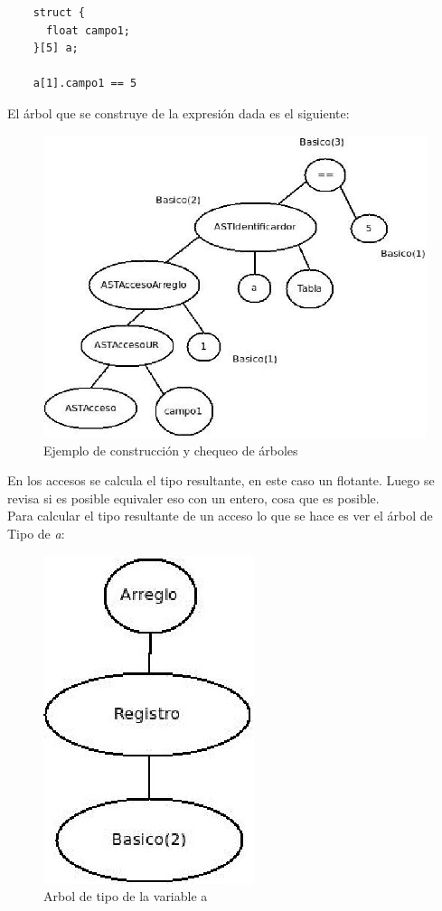 \documentclass[11pt, spanish]{report}
\begin{document}
     \begin{verbatim}
	struct {
	  float campo1;
	}[5] a;

	a[1].campo1 == 5
     \end{verbatim}

\newpage 
El \'arbol que se construye de la expresi\'on dada es el siguiente:\\

\begin{figure}[htp]
  \centering
  \mbox{\includegraphics[scale=0.5]{arbol2.jpg}}
  \caption{Ejemplo de construcci\'on y chequeo de \'arboles}
  \label{fig arbol2}
\end{figure}

En los accesos se calcula el tipo resultante, en este caso un flotante. Luego se revisa si es posible equivaler eso con un entero, cosa que es posible.\\

Para calcular el tipo resultante de un acceso lo que se hace es ver el \'arbol de Tipo de \emph{a}:

\begin{figure}[htp]
  \centering
  \mbox{\includegraphics[scale=0.5]{arbolTipo.jpg}}
  \caption{Arbol de tipo de la variable a}
  \label{fig arbolTipo}
\end{figure}
\end{document}

